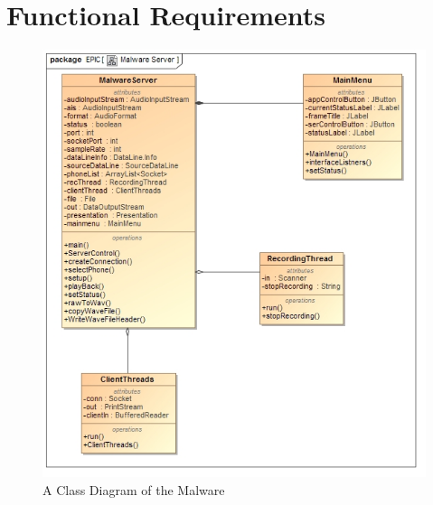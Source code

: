	\section{Functional Requirements}
		\begin{figure}[H]
 			 \centering
			  \includegraphics[width=12cm]{MalwareClass}
		 	 \caption{A Class Diagram of the Malware}
		\end{figure}
		
        







